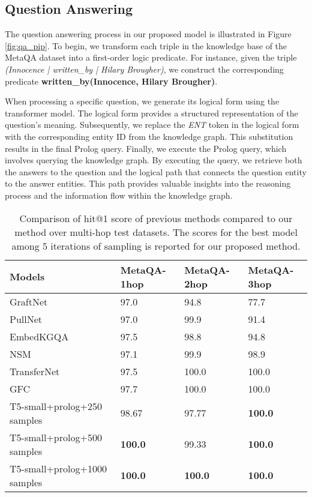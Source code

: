 \documentclass[11pt]{article}
\begin{document}
\subsection{Question Answering}

The question answering process in our proposed model is illustrated in Figure \ref{fig:qa_pip}. To begin, we transform each triple in the knowledge base of the MetaQA dataset into a first-order logic predicate. For instance, given the triple \emph{(Innocence | written\_by | Hilary Brougher)}, we construct the corresponding predicate \textbf{written\_by(Innocence, Hilary Brougher)}.

When processing a specific question, we generate its logical form using the transformer model. The logical form provides a structured representation of the question's meaning. Subsequently, we replace the \emph{ENT} token in the logical form with the corresponding entity ID from the knowledge graph. This substitution results in the final Prolog query. Finally, we execute the Prolog query, which involves querying the knowledge graph. By executing the query, we retrieve both the answers to the question and the logical path that connects the question entity to the answer entities. This path provides valuable insights into the reasoning process and the information flow within the knowledge graph.

\begin{table*}

\begin{center}
\begin{tabular}{|l|l|l|l|}
\hline

Models                & MetaQA-1hop & MetaQA-2hop & MetaQA-3hop \\
\hline\hline
GraftNet \citep{Sun2018OpenDQ}           & 97.0     & 94.8     & 77.7     \\
PullNet \citep{Sun2019PullNetOD}            & 97.0     & 99.9     & 91.4     \\
EmbedKGQA \citep{Saxena2020ImprovingMQ}            & 97.5     & 98.8     & 94.8     \\
NSM \citep{He2021ImprovingMK}               & 97.1     & 99.9     & 98.9     \\
TransferNet \citep{shi-etal-2021-transfernet}       & 97.5     & 100.0     & 100.0     \\
GFC \citep{Xie2022ASF}               & 97.7     & 100.0     & 100.0     \\
\hline
T5-small+prolog+250 samples  & 98.67    & 97.77    & \textbf{100.0}    \\
T5-small+prolog+500 samples  & \textbf{100.0}    & 99.33    & \textbf{100.0}         \\
T5-small+prolog+1000 samples & \textbf{100.0}    & \textbf{100.0}    & \textbf{100.0}    \\    
\hline

\end{tabular}
\caption{Comparison of hit@1 score of previous methods compared to our method over multi-hop test
datasets. The scores for the best model among 5 iterations of sampling is reported for our proposed method.}
\label{tab:results}

\end{center}
\end{table*}
\end{document}

